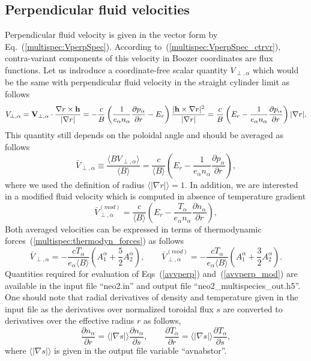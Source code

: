 \documentclass[preprint,prb,aps]{revtex4-1}
\newcommand{\be}[1]{\begin{equation} \label{#1}}
\newcommand{\ee}{\end{equation}}
\newcommand{\eq}[1]{(\ref{#1})}
\newcommand{\difp}[2]{\frac{\partial #1}{\partial #2}}
\newcommand{\bV}{{\bf V}}
\newcommand{\bh}{{\bf h}}
\begin{document}

\subsection{Perpendicular fluid velocities}

Perpendicular fluid velocity is given in the vector form by Eq.~\eq{multispec:VperpSpec}.
According to~\eq{multispec:VperpSpec_ctrvr}, contra-variant components of this velocity in
Boozer coordinates are flux functions. Let us indroduce a coordinate-free scalar quantity
$V_{\perp,\alpha}$ which would be the same with perpendicular fluid velocity in the straight
cylinder limit as follows
\be{scalvperp}
V_{\perp,\alpha}=\bV_{\perp,\alpha}\cdot\frac{\nabla r \times\bh}{|\nabla r|}
=
-\frac{c}{B} \left( \frac{1}{e_\alpha n_\alpha} \difp{p_\alpha}{r} - E_r \right)
\frac{|\bh \times {\nabla}r|^2}{|\nabla r|}
=\frac{c}{B} \left( E_r - \frac{1}{e_\alpha n_\alpha} \difp{p_\alpha}{r}\right) |\nabla r|.
\ee
This quantity still depends on the poloidal angle and should be averaged as follows
\be{avvperp}
\bar V_{\perp,\alpha}\equiv
\frac{\langle B V_{\perp,\alpha}\rangle}{\langle B \rangle}
=
\frac{c}{\langle B \rangle}
\left( E_r - \frac{1}{e_\alpha n_\alpha} \difp{p_\alpha}{r}\right),
\ee
where we used the definition of radius $\langle |\nabla r| \rangle = 1$.
In addition, we are interested in a modified fluid velocity which is computed
in absence of temperature gradient
\be{avvperp_mod}
\bar V_{\perp,\alpha}^{(mod)}
=
\frac{c}{\langle B \rangle}
\left( E_r - \frac{T_\alpha}{e_\alpha n_\alpha} \difp{n_\alpha}{r}\right),
\ee
Both averaged velocities can be expressed in terms of thermodynamic
forces~\eq{multispec:thermodyn_forces} as follows
\be{avvperp_forces}
\bar V_{\perp,\alpha} = -\frac{c T_\alpha}{e_\alpha \langle B \rangle}
\left(A_1^\alpha+\frac{5}{2}A_2^\alpha\right),
\qquad
\bar V_{\perp,\alpha}^{(mod)} = -\frac{c T_\alpha}{e_\alpha \langle B \rangle}
\left(A_1^\alpha+\frac{3}{2}A_2^\alpha\right).
\ee
Quantities required for evaluation of Eqs~\eq{avvperp} and~\eq{avvperp_mod} are available
in the input file ``neo2.in'' and output file ``neo2\_multispecies\_out.h5''. One should
note that radial derivatives of density and temperature given in the input file as the
derivatives over normalized toroidal flux $s$ are converted to derivatives over
the effective radius $r$ as follows,
\be{radders}
\difp{n_\alpha}{r}=\langle|\nabla s|\rangle \difp{n_\alpha}{s},
\qquad
\difp{T_\alpha}{r}=\langle|\nabla s|\rangle \difp{T_\alpha}{s},
\ee
where $\langle|\nabla s|\rangle$ is given in the output file variable ``avnabstor''.
\end{document}
